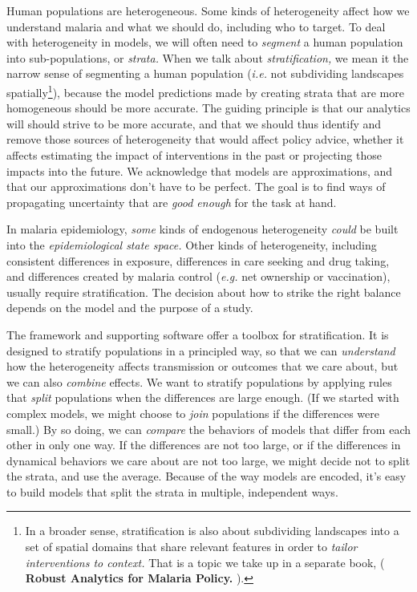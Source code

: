 \documentclass[
]{book}
\begin{document}
Human populations are heterogeneous. Some kinds of heterogeneity affect how we understand malaria and what we should do, including who to target. To deal with heterogeneity in models, we will often need to \emph{segment} a human population into sub-populations, or \emph{strata.} When we talk about \emph{stratification,} we mean it the narrow sense of segmenting a human population (\emph{i.e.} not subdividing landscapes spatially\footnote{In a broader sense, stratification is also about subdividing landscapes into a set of spatial domains that share relevant features in order to \emph{tailor interventions to context.} That is a topic we take up in a separate book, ( \textbf{Robust Analytics for Malaria Policy.} ).}), because the model predictions made by creating strata that are more homogeneous should be more accurate. The guiding principle is that our analytics will should strive to be more accurate, and that we should thus identify and remove those sources of heterogeneity that would affect policy advice, whether it affects estimating the impact of interventions in the past or projecting those impacts into the future. We acknowledge that models are approximations, and that our approximations don't have to be perfect. The goal is to find ways of propagating uncertainty that are \emph{good enough} for the task at hand.

In malaria epidemiology, \emph{some} kinds of endogenous heterogeneity \emph{could} be built into the \emph{epidemiological state space.} Other kinds of heterogeneity, including consistent differences in exposure, differences in care seeking and drug taking, and differences created by malaria control (\emph{e.g.} net ownership or vaccination), usually require stratification. The decision about how to strike the right balance depends on the model and the purpose of a study.

The framework and supporting software offer a toolbox for stratification. It is designed to stratify populations in a principled way, so that we can \emph{understand} how the heterogeneity affects transmission or outcomes that we care about, but we can also \emph{combine} effects. We want to stratify populations by applying rules that \emph{split} populations when the differences are large enough. (If we started with complex models, we might choose to \emph{join} populations if the differences were small.) By so doing, we can \emph{compare} the behaviors of models that differ from each other in only one way. If the differences are not too large, or if the differences in dynamical behaviors we care about are not too large, we might decide not to split the strata, and use the average. Because of the way models are encoded, it's easy to build models that split the strata in multiple, independent ways.
\end{document}
